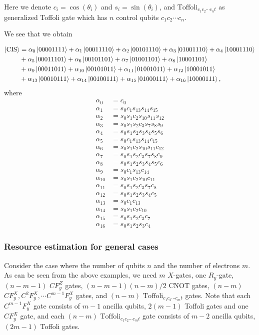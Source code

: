 \documentclass[11pt, oneside]{article}   	%
\begin{document}
Here we denote $c_i = \cos(\theta_i)$ and $s_i = \sin(\theta_i)$, 
and $\text{Toffoli}_{c_1 c_2 \cdots c_n t}$ as generalized Toffoli gate which has $n$ control qubits $c_1 c_2 \cdots c_n$.

We see that we obtain

\begin{align*}
\ket{\text{CIS}} 
&= \alpha_0 \ket{00001111} 
+ \alpha_1 \ket{00011110} 
+ \alpha_2 \ket{00101110} 
+ \alpha_3 \ket{01001110}
+ \alpha_4 \ket{10001110} \\
&+ \alpha_5 \ket{00011101} 
+ \alpha_6 \ket{00101101} 
+ \alpha_7 \ket{01001101} 
+ \alpha_8 \ket{10001101} \\
&+ \alpha_9 \ket{00011011} 
+ \alpha_{10} \ket{00101011}
+ \alpha_{11} \ket{01001011}
+ \alpha_{12} \ket{10001011} \\
&+ \alpha_{13} \ket{00010111} 
+ \alpha_{14} \ket{00100111}
+ \alpha_{15} \ket{01000111}
+ \alpha_{16} \ket{10000111},
\end{align*}
where
\begin{align*}
\alpha_0 &= c_0 \\
\alpha_1 &= s_0 c_1 s_{13} s_{14} s_{15} \\
\alpha_2 &= s_0 s_1 c_2 s_{10} s_{11} s_{12} \\
\alpha_3 &= s_0 s_1 s_2 c_3 s_7 s_8 s_9 \\
\alpha_4 &= s_0 s_1 s_2 s_3 s_4 s_5 s_6 \\
\alpha_5 &= s_0 c_1 s_{13} s_{14} c_{15} \\
\alpha_6 &= s_0 s_1 c_2 s_{10} s_{11} c_{12} \\
\alpha_7 &= s_0 s_1 s_2 c_3 s_7 s_8 c_9 \\
\alpha_8 &= s_0 s_1 s_2 s_3 s_4 s_5 c_6 \\
\alpha_9 &= s_0 c_1 s_{13} c_{14} \\ 
\alpha_{10} &= s_0 s_1 c_2 s_{10} c_{11} \\
\alpha_{11} &= s_0 s_1 s_2 c_3 s_7 c_8 \\
\alpha_{12} &= s_0 s_1 s_2 s_3 s_4 c_5 \\
\alpha_{13} &= s_0 c_1 c_{13} \\
\alpha_{14} &= s_0 s_1 c_2 c_{10} \\
\alpha_{15} &= s_0 s_1 s_2 c_3 c_7 \\
\alpha_{16} &= s_0 s_1 s_2 s_3 c_4 
\end{align*}


\subsubsection{Resource estimation for general cases}
Consider the case where the number of qubits $n$ and the number of electrons $m$.
As can be seen from the above examples, we need 
$m$ $X$-gates, 
one $R_y$-gate, 
$(n-m-1)$ $CF^Z_y$ gates, 
$(n-m-1) (n-m) / 2$ CNOT gates,
$(n-m)$ $CF^X_y, C^2 F^X_y, \cdots C^{m-1} F^X_y$ gates, and 
$(n-m)$ $\text{Toffoli}_{c_1 c_2 \cdots c_m t}$ gates.
Note that each $C^{m-1} F^X_y$ gate consists of $m-1$ ancilla qubits, $2(m-1)$ Toffoli gates and one $CF^X_y$ gate, and
each $(n-m)$ $\text{Toffoli}_{c_1 c_2 \cdots c_m t}$ gate consists of $m-2$ ancilla qubits, $(2m-1)$ Toffoli gates.
\end{document}
